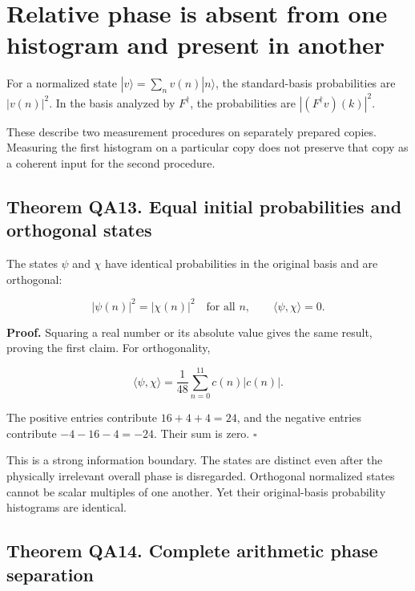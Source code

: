 \hypertarget{relative-phase-is-absent-from-one-histogram-and-present-in-another}{%
\section{Relative phase is absent from one histogram and present in
another}\label{relative-phase-is-absent-from-one-histogram-and-present-in-another}}

For a normalized state \(|v\rangle=\sum_nv(n)|n\rangle\), the
standard-basis probabilities are \(|v(n)|^2\). In the basis analyzed by
\(F^\dagger\), the probabilities are \(|(F^\dagger v)(k)|^2\).

These describe two measurement procedures on separately prepared copies.
Measuring the first histogram on a particular copy does not preserve
that copy as a coherent input for the second procedure.

\hypertarget{theorem-qa13.-equal-initial-probabilities-and-orthogonal-states}{%
\subsection*{Theorem QA13. Equal initial probabilities and orthogonal
states}\label{theorem-qa13.-equal-initial-probabilities-and-orthogonal-states}}

The states \(\psi\) and \(\chi\) have identical probabilities in the
original basis and are orthogonal:

\[
|\psi(n)|^2=|\chi(n)|^2\quad\text{for all }n,
\qquad \langle\psi,\chi\rangle=0.
\]

\textbf{Proof.} Squaring a real number or its absolute value gives the
same result, proving the first claim. For orthogonality,

\[
\langle\psi,\chi\rangle
=\frac1{48}\sum_{n=0}^{11}c(n)|c(n)|.
\]

The positive entries contribute \(16+4+4=24\), and the negative entries
contribute \(-4-16-4=-24\). Their sum is zero. \(\square\)

This is a strong information boundary. The states are distinct even
after the physically irrelevant overall phase is disregarded. Orthogonal
normalized states cannot be scalar multiples of one another. Yet their
original-basis probability histograms are identical.

\hypertarget{theorem-qa14.-complete-arithmetic-phase-separation}{%
\subsection*{Theorem QA14. Complete arithmetic phase
separation}\label{theorem-qa14.-complete-arithmetic-phase-separation}}

